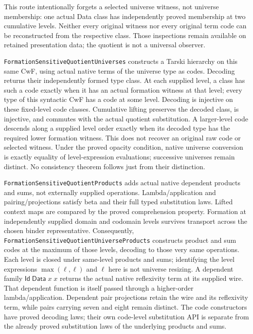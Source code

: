 \documentclass[11pt]{article}
\theoremstyle{definition}
\theoremstyle{remark}
\begin{document}
This route intentionally forgets a selected universe witness, not universe
membership: one actual Data class has independently proved membership at
two cumulative levels. Neither every original witness nor every original
term code can be reconstructed from the respective class. Those inspections
remain available on retained presentation data; the quotient is not a
universal observer.

\nolinkurl{FormationSensitiveQuotientUniverses} constructs a Tarski hierarchy
on this same CwF, using actual native terms of the universe type as codes.
Decoding returns their independently formed type class. At each supplied
level, a class has such a code exactly when it has an actual formation
witness at that level; every type of this syntactic CwF has a code at some
level. Decoding is injective on these fixed-level code classes. Cumulative
lifting preserves the decoded class, is injective, and commutes with the
actual quotient substitution. A larger-level code descends along a supplied
level order exactly when its decoded type has the required lower formation
witness. This does not recover an original raw code or selected witness.
Under the proved opacity condition, native universe conversion is exactly
equality of level-expression evaluations; successive universes remain
distinct. No consistency theorem follows just from their distinction.

\nolinkurl{FormationSensitiveQuotientProducts} adds actual native dependent
products and sums, not externally supplied operations. Lambda/application
and pairing/projections satisfy beta and their full typed substitution
laws. Lifted context maps are compared by the proved comprehension property.
Formation at independently supplied domain and codomain levels survives
transport across the chosen binder representative. Consequently,
\nolinkurl{FormationSensitiveQuotientUniverseProducts} constructs product
and sum codes at the maximum of those levels, decoding to those very same
operations. Each level is closed under same-level products and sums;
identifying the level expressions $\max(\ell,\ell)$ and $\ell$ here is not
universe resizing. A dependent family
$\mathsf{Id}\;\mathsf{Data}\;x\;x$ returns the actual native reflexivity
term at its supplied wire. That dependent function is itself passed through
a higher-order lambda/application. Dependent pair projections retain the
wire and its reflexivity term, while pairs carrying seven and eight remain
distinct. The code constructors have proved decoding laws; their own
code-level substitution API is separate from the already proved substitution
laws of the underlying products and sums.
\end{document}
